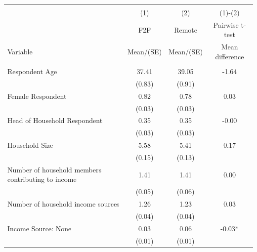 
\begin{tabular}{@{\extracolsep{5pt}}lccc}
\\[-1.8ex]\hline \hline \\[-1.8ex]
 & \multicolumn{1}{c}{(1)}  & \multicolumn{1}{c}{(2)}  & \multicolumn{1}{c}{(1)-(2)} \\
 & \multicolumn{1}{c}{F2F}  & \multicolumn{1}{c}{Remote}  & \multicolumn{1}{c}{Pairwise t-test}  \\
Variable & Mean/(SE) & Mean/(SE) & Mean difference \\ \hline \\[-1.8ex] 
Respondent Age   & 37.41    & 39.05    & -1.64   \\
 & (0.83)  & (0.91)  &  \\ [1ex]
Female Respondent   & 0.82    & 0.78    & 0.03   \\
 & (0.03)  & (0.03)  &  \\ [1ex]
Head of Household Respondent   & 0.35    & 0.35    & -0.00   \\
 & (0.03)  & (0.03)  &  \\ [1ex]
Household Size   & 5.58    & 5.41    & 0.17   \\
 & (0.15)  & (0.13)  &  \\ [1ex]
Number of household members contributing to income   & 1.41    & 1.41    & 0.00   \\
 & (0.05)  & (0.06)  &  \\ [1ex]
Number of household income sources   & 1.26    & 1.23    & 0.03   \\
 & (0.04)  & (0.04)  &  \\ [1ex]
Income Source: None   & 0.03    & 0.06    & -0.03*   \\
 & (0.01)  & (0.01)  &  \\ [1ex]

\end{tabular}
